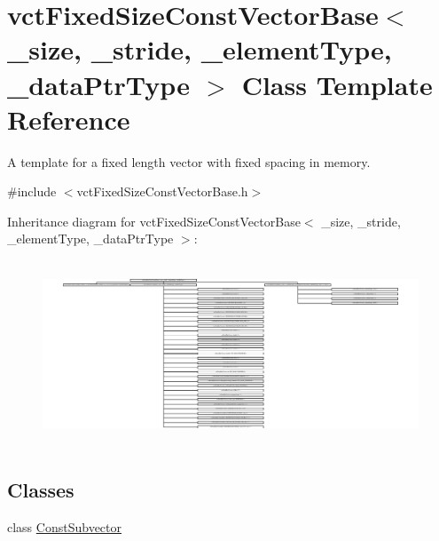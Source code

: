 \hypertarget{classvct_fixed_size_const_vector_base}{\section{vct\-Fixed\-Size\-Const\-Vector\-Base$<$ \-\_\-size, \-\_\-stride, \-\_\-element\-Type, \-\_\-data\-Ptr\-Type $>$ Class Template Reference}
\label{classvct_fixed_size_const_vector_base}
}


A template for a fixed length vector with fixed spacing in memory.  




{\ttfamily \#include $<$vct\-Fixed\-Size\-Const\-Vector\-Base.\-h$>$}

Inheritance diagram for vct\-Fixed\-Size\-Const\-Vector\-Base$<$ \-\_\-size, \-\_\-stride, \-\_\-element\-Type, \-\_\-data\-Ptr\-Type $>$\-:\begin{figure}[H]
\begin{center}
\leavevmode
\includegraphics[height=5.549550cm]{d3/dde/classvct_fixed_size_const_vector_base}
\end{center}
\end{figure}
\subsection*{Classes}
\begin{DoxyCompactItemize}
\item 
class \hyperlink{classvct_fixed_size_const_vector_base_1_1_const_subvector}{Const\-Subvector}
\end{DoxyCompactItemize}
